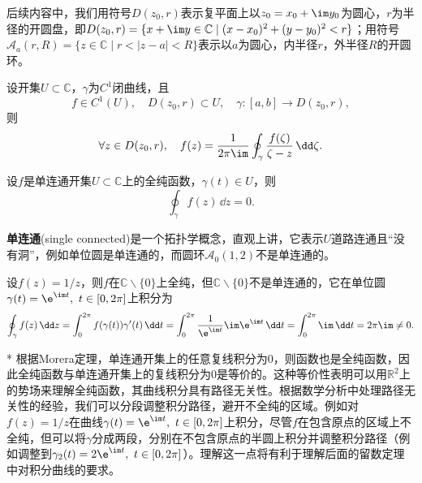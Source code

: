 后续内容中，我们用符号$D(z_0,r)$表示复平面上以$z_0=x_0+\im y_0$为圆心，$r$为半径的开圆盘，即$D(z_0,r)=\{x+\im y\in\mathbb{C}\mid (x-x_0)^2+(y-y_0)^2<r\}$；用符号$\mathcal{A}_a(r,R)=\{z\in\mathbb{C}\mid r<|z-a|<R\}$表示以$a$为圆心，内半径$r$，外半径$R$的开圆环。
\begin{theorem}[Cauchy积分公式]
    设开集$U\subset\mathbb{C}$，$\gamma$为$C^1$闭曲线，且
    \begin{equation}
        f\in C^1(U),\quad D(z_0,r)\subset U,\quad \gamma:[a,b]\to D(z_0,r),
    \end{equation}
    则
    \begin{equation}
        \forall z\in D(z_0,r),\quad f(z)=\frac{1}{2\pi\im}\oint_{\gamma}\frac{f(\zeta)}{\zeta-z}\,\dd\zeta.
    \end{equation}
\end{theorem}
\begin{theorem}[Cauchy积分定理]
    设$f$是单连通开集$U\subset\mathbb{C}$上的全纯函数，$\gamma(t)\in U$，则
    \begin{equation}
        \oint_{\gamma}f(z)\,\dd z=0.
    \end{equation}
\end{theorem}
\begin{remark}
    \textbf{单连通}(single connected)是一个拓扑学概念，直观上讲，它表示$U$道路连通且“没有洞”，例如单位圆是单连通的，而圆环$\mathcal{A}_0(1,2)$不是单连通的。
\end{remark}
\begin{example}
    设$f(z)=1/z$，则$f$在$\mathbb{C}\backslash\{0\}$上全纯，但$\mathbb{C}\backslash\{0\}$不是单连通的，它在单位圆$\gamma(t)=\e^{\im t},\ t\in[0,2\pi]$上积分为
    \begin{equation}
        \oint_{\gamma}f(z)\,\dd z=\int_0^{2\pi}f(\gamma(t))\gamma'(t)\,\dd t=\int_0^{2\pi}\frac{1}{\e^{\im t}}\im\e^{\im t}\,\dd t=\int_0^{2\pi}\im\,\dd t=2\pi\im\neq 0.
    \end{equation}
\end{example}

\begin{remark}*
    根据Morera定理，单连通开集上的任意复线积分为$0$，则函数也是全纯函数，因此全纯函数与单连通开集上的复线积分为$0$是等价的。这种等价性表明可以用$\mathbb{R}^2$上的势场来理解全纯函数，其曲线积分具有路径无关性。根据数学分析中处理路径无关性的经验，我们可以分段调整积分路径，避开不全纯的区域。例如对$f(z)=1/z$在曲线$\gamma(t)=\e^{\im t},\ t\in[0,2\pi]$上积分，尽管$f$在包含原点的区域上不全纯，但可以将$\gamma$分成两段，分别在不包含原点的半圆上积分并调整积分路径（例如调整到$\gamma_2(t)=2\e^{\im t},\ t\in[0,2\pi]$）。理解这一点将有利于理解后面的留数定理中对积分曲线的要求。
\end{remark}

